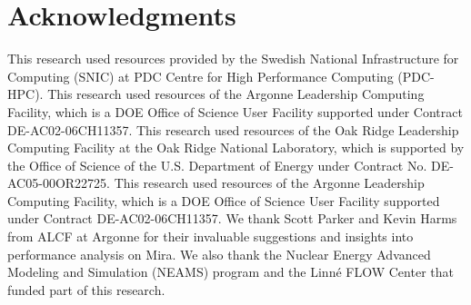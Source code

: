\documentclass{sig-alternate}
\begin{document}
\section{Acknowledgments}
This research used resources provided by the Swedish National 
Infrastructure for Computing (SNIC) at PDC Centre for High Performance Computing (PDC-HPC).
This research used resources of the Argonne Leadership Computing Facility, which is a DOE Office of Science User Facility supported under Contract DE-AC02-06CH11357.
This research used resources of the Oak Ridge Leadership Computing Facility at 
the Oak Ridge National Laboratory, which is supported by the Office of Science of 
the U.S. Department of Energy under Contract No. DE-AC05-00OR22725. 
This research used resources of the Argonne Leadership Computing Facility, which
is a DOE Office of Science User Facility supported under Contract
DE-AC02-06CH11357.
We thank Scott Parker and Kevin Harms from ALCF at Argonne for their invaluable
suggestions and insights into performance analysis on Mira. We also thank the Nuclear Energy Advanced Modeling and Simulation (NEAMS) program and the Linn{\'e} FLOW Center that funded part of this research.
%

%
%

\vskip 40pt
\begin{flushright}
\scriptsize {} \normalsize
\end{flushright}
\end{document}

